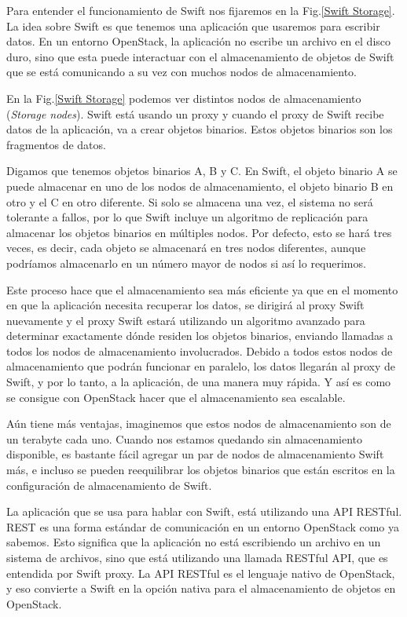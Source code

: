 Para entender el funcionamiento de Swift nos fijaremos en la Fig.\ref{Swift Storage}. La idea sobre Swift es que tenemos una aplicación que usaremos para escribir datos. En un entorno OpenStack, la aplicación no escribe un archivo en el disco duro, sino que esta puede interactuar con el almacenamiento de objetos de Swift que  se está comunicando a su vez con muchos nodos de almacenamiento.

En la Fig.\ref{Swift Storage} podemos ver distintos nodos de almacenamiento (\textit{Storage nodes}). Swift está usando un proxy y cuando el proxy de Swift recibe datos de la aplicación, va a crear objetos binarios. Estos objetos binarios son los fragmentos de datos.

Digamos que tenemos objetos binarios A, B y C. En Swift, el objeto binario A se puede almacenar en uno de los nodos de almacenamiento, el objeto binario B en otro y el C en otro diferente. Si solo se almacena una vez, el sistema no será tolerante a fallos, por lo que Swift incluye un algoritmo de replicación para almacenar los objetos binarios en múltiples nodos. Por defecto, esto se hará tres veces, es decir, cada objeto se almacenará en tres nodos diferentes, aunque podríamos almacenarlo en un número mayor de nodos si así lo requerimos.

Este proceso hace que el almacenamiento sea más eficiente ya que en el momento en que la aplicación necesita recuperar los datos, se dirigirá al proxy Swift nuevamente y el proxy Swift estará utilizando un algoritmo avanzado para determinar exactamente dónde residen los objetos binarios, enviando llamadas a todos los nodos de almacenamiento involucrados. Debido a todos estos nodos de almacenamiento que podrán funcionar en paralelo, los datos llegarán al proxy de Swift, y por lo tanto, a la aplicación, de una manera muy rápida. Y así es como se consigue con OpenStack hacer que el almacenamiento sea escalable.

Aún tiene más ventajas, imaginemos que estos nodos de almacenamiento son de un terabyte cada uno. Cuando nos estamos quedando sin almacenamiento disponible, es bastante fácil agregar un par de nodos de almacenamiento Swift más, e incluso se pueden reequilibrar los objetos binarios que están escritos en la configuración de almacenamiento de Swift.

La aplicación que se usa para hablar con Swift, está utilizando una API RESTful.
REST es una forma estándar de comunicación en un entorno OpenStack como ya sabemos. Esto significa que la aplicación no está escribiendo un archivo en un sistema de archivos, sino que está utilizando una llamada RESTful API, que es entendida por Swift proxy. La API RESTful es el lenguaje nativo de OpenStack, y eso convierte a Swift en la opción nativa para el almacenamiento de objetos en OpenStack.

